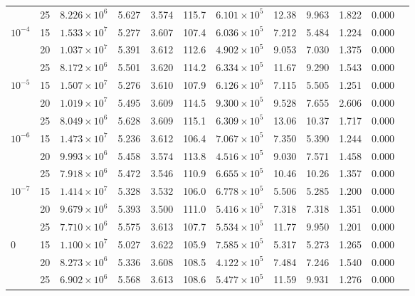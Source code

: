 {\begin{table}[h!]
{\begin{tabular}{lccccccccccc}
                    & 25 & $8.226 \times 10^6$  & 5.627 & 3.574 & 115.7 & $6.101 \times 10^5$ & 12.38  & 9.963  & 1.822  & 0.000  \\
        $10^{-4}$   & 15 & $1.533 \times 10^7$  & 5.277 & 3.607 & 107.4 & $6.036 \times 10^5$ & 7.212  & 5.484  & 1.224  & 0.000  \\
                    & 20 & $1.037 \times 10^7$  & 5.391 & 3.612 & 112.6 & $4.902 \times 10^5$ & 9.053  & 7.030  & 1.375  & 0.000  \\
                    & 25 & $8.172 \times 10^6$  & 5.501 & 3.620 & 114.2 & $6.334 \times 10^5$ & 11.67  & 9.290  & 1.543  & 0.000  \\
        $10^{-5}$   & 15 & $1.507 \times 10^7$  & 5.276 & 3.610 & 107.9 & $6.126 \times 10^5$ & 7.115  & 5.505  & 1.251  & 0.000  \\
                    & 20 & $1.019 \times 10^7$  & 5.495 & 3.609 & 114.5 & $9.300 \times 10^5$ & 9.528  & 7.655  & 2.606  & 0.000  \\
                    & 25 & $8.049 \times 10^6$  & 5.628 & 3.609 & 115.1 & $6.309 \times 10^5$ & 13.06  & 10.37  & 1.717  & 0.000  \\
        $10^{-6}$   & 15 & $1.473 \times 10^7$  & 5.236 & 3.612 & 106.4 & $7.067 \times 10^5$ & 7.350  & 5.390  & 1.244  & 0.000  \\
                    & 20 & $9.993 \times 10^6$  & 5.458 & 3.574 & 113.8 & $4.516 \times 10^5$ & 9.030  & 7.571  & 1.458  & 0.000  \\
                    & 25 & $7.918 \times 10^6$  & 5.472 & 3.546 & 110.9 & $6.655 \times 10^5$ & 10.46  & 10.26  & 1.357  & 0.000  \\
        $10^{-7}$   & 15 & $1.414 \times 10^7$  & 5.328 & 3.532 & 106.0 & $6.778 \times 10^5$ & 5.506  & 5.285  & 1.200  & 0.000  \\
                    & 20 & $9.679 \times 10^6$  & 5.393 & 3.500 & 111.0 & $5.416 \times 10^5$ & 7.318  & 7.318  & 1.351  & 0.000  \\
                    & 25 & $7.710 \times 10^6$  & 5.575 & 3.613 & 107.7 & $5.534 \times 10^5$ & 11.77  & 9.950  & 1.201  & 0.000  \\
        $0$         & 15 & $1.100 \times 10^7$  & 5.027 & 3.622 & 105.9 & $7.585 \times 10^5$ & 5.317  & 5.273  & 1.265  & 0.000  \\
                    & 20 & $8.273 \times 10^6$  & 5.336 & 3.608 & 108.5 & $4.122 \times 10^5$ & 7.484  & 7.246  & 1.540  & 0.000  \\
                    & 25 & $6.902 \times 10^6$  & 5.568 & 3.613 & 108.6 & $5.477 \times 10^5$ & 11.59  & 9.931  & 1.276  & 0.000  \\
        \bottomrule    
        \end{tabular}}
    \label{tab:CIEVMZ}
\end{table}
}

